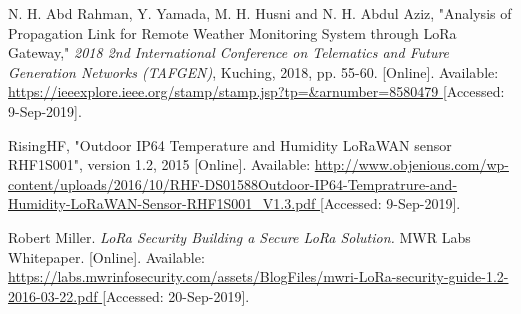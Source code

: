 \begin{thebibliography}{9}









N. H. Abd Rahman, Y. Yamada, M. H. Husni and N. H. Abdul Aziz, "Analysis of Propagation Link for Remote Weather Monitoring System through LoRa Gateway," \textit{2018 2nd International Conference on Telematics and Future Generation Networks (TAFGEN)}, Kuching, 2018, pp. 55-60.
[Online]. Available:
\url{
https://ieeexplore.ieee.org/stamp/stamp.jsp?tp=&arnumber=8580479
}
[Accessed: 9-Sep-2019].


RisingHF, "Outdoor IP64 Temperature and Humidity LoRaWAN sensor RHF1S001", version 1.2, 2015
[Online]. Available:
\url{
http://www.objenious.com/wp-content/uploads/2016/10/RHF-DS01588Outdoor-IP64-Tempratrure-and-Humidity-LoRaWAN-Sensor-RHF1S001_V1.3.pdf
}
[Accessed: 9-Sep-2019].

Robert Miller.
\textit{
LoRa Security
Building a Secure LoRa Solution.
}
MWR Labs Whitepaper.
[Online]. Available:
\url{
https://labs.mwrinfosecurity.com/assets/BlogFiles/mwri-LoRa-security-guide-1.2-2016-03-22.pdf
}
[Accessed: 20-Sep-2019].


\end{thebibliography}
